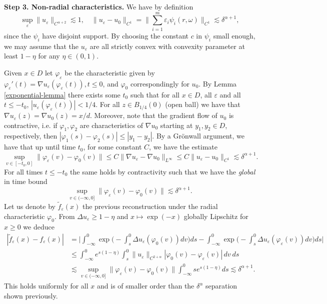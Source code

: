 \documentclass{article}
\numberwithin{equation}{section}
\theoremstyle{definition}
\providecommand{\eps}{\varepsilon}
\renewcommand{\phi}{\varphi}
\renewcommand{\le}{\leqslant}
\renewcommand{\ge}{\geqslant}
\begin{document}
{
\textbf{Step 3. Non-radial characteristics.} We have by definition
\[\sup_\eps \|u_\eps\|_{C^{\alpha+2}} \lesssim 1,\quad
 \|u_\eps - u_0\|_{C^1} = \big\|\sum_{i=1}^m \eps_i\psi_i(r,\omega) \big \|_{C^1} \lesssim \delta^{\alpha +1}, \]
since the $\psi_i$ have disjoint support. By choosing the constant $c$ in $\psi_i$ small enough, we may assume that the $u_\eps$ are all strictly convex with convexity parameter at least $1-\eta$ for any $\eta\in(0,1)$.

Given $x\in D$ let $\varphi_\eps$ be the characteristic given by $\varphi_\eps'(t)=\nabla u_\eps(\varphi_\eps(t)) , t\le 0$, and $\phi_0$ correspondingly for $u_0$. By Lemma \ref{exponential-lemma} there exists some $t_0$ such that for all $x\in D$, all $\eps$ and all $t\le -t_0$, $|u_\eps(\varphi_\eps(t))|<1/4$. For all $z\in B_{1/4}(0)$ (open ball) we have that $\nabla u_\eps(z)=\nabla u_0(z)=x/d$. Moreover, note that the gradient flow of $u_0$ is contractive, i.e. if $\varphi_1, \varphi_2$ are characteristics of $\nabla u_0$ starting at $y_1,y_2\in D$, respectively, then $|\varphi_1(s) -\varphi_2(s)|\le |y_1-y_2|$. By a Gr\"onwall argument, we have that up until time $t_0$, for some constant $C$, we have the estimate
\[ \sup_{v\in [-t_0,0]}\|\varphi_\eps(v) -\varphi_0 (v)\|\le C \|\nabla u_\eps - \nabla u_0\|_{L^\infty}\le  C \|u_\eps - u_0\|_{C^1}\lesssim \delta^{\alpha+1}. \]
For all times $t\le -t_0$ the same holds by contractivity such that we have the \textit{global} in time bound
\[ \sup_{v\in (-\infty,0]}\|\varphi_\eps(v) -\varphi_0(v)\|\lesssim \delta^{\alpha+1}. \]
Let us denote by $\tilde f_\eps(x)$ the previous reconstruction under the radial characteristic $\varphi_0$. From $\Delta u_\eps\ge 1-\eta$ and $x\mapsto \exp(-x)$  globally Lipschitz for $x\ge0$ we deduce
\begin{align*}
    |\tilde f_\eps(x)-f_\eps(x)| &= \Big| \int_{-\infty}^0 \exp\Big(- \int_{s}^0\Delta u_\eps(\varphi_0(v)) dv\Big) ds - \int_{-\infty}^0 \exp\Big(-\int_{s}^0\Delta u_\eps(\varphi_\eps(v)) dv\Big) ds\Big|\\
    &\le \int_{-\infty}^0 e^{s(1-\eta)} \int_s^0 \|u_\eps\|_{C^{2+\alpha}}|\varphi_0(v) -\varphi_\eps(v)|\, dv ~ ds \\
    & \lesssim  \sup_{v\in (-\infty,0]}\|\varphi_\eps(v) -\varphi_0 (v)\|\int_{-\infty}^0 s e^{s(1-\eta)}  ds \lesssim \delta^{\alpha+1}.
\end{align*} 
This holds uniformly for all $x$ and is of smaller order than the $\delta^\alpha$ separation shown previously. 

}
\end{document}

